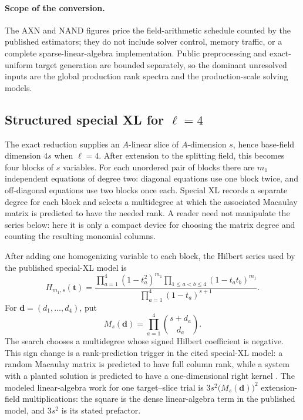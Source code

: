 \documentclass[11pt]{article}
\begin{document}
\paragraph{Scope of the conversion.}
The AXN and NAND figures price the field-arithmetic schedule counted by the
published estimators; they do not include solver control, memory traffic, or a
complete sparse-linear-algebra implementation.  Public preprocessing and
exact-uniform target generation are bounded separately, so the dominant
unresolved inputs are the global production rank spectra and the
production-scale solving models.

\subsection{Structured special XL for \texorpdfstring{$\ell=4$}{l=4}}\label{sec:special-xl}

The exact reduction supplies an $A$-linear slice of $A$-dimension $s$,
hence base-field dimension $4s$ when $\ell=4$.  After extension to the
splitting field, this becomes four blocks of $s$ variables.  For each unordered pair of blocks there are $m_1$ independent equations
of degree two: diagonal equations use one block twice, and off-diagonal
equations use two blocks once each.  Special XL records a separate degree for
each block and selects a multidegree
at which the associated Macaulay matrix is predicted to have the needed rank.
A reader need not manipulate the series below: here it is only a compact device
for choosing the matrix degree and counting the resulting monomial columns.

After adding one homogenizing variable to each block, the Hilbert series used
by the published special-XL model is
\begin{equation}\label{eq:hilbert-series}
 H_{m_1,s}(\mathbf t)=
 \frac{\prod_{a=1}^{4}(1-t_a^2)^{m_1}
       \prod_{1\le a<b\le4}(1-t_at_b)^{m_1}}
      {\prod_{a=1}^{4}(1-t_a)^{s+1}}.
\end{equation}
For $\mathbf d=(d_1,\ldots,d_4)$, put
\begin{equation}\label{eq:macaulay-size}
 M_s(\mathbf d)=\prod_{a=1}^{4}\binom{s+d_a}{d_a}.
\end{equation}
The search chooses a multidegree whose signed Hilbert coefficient is
negative.  This sign change is a rank-prediction trigger in the cited
special-XL model: a random Macaulay matrix is predicted to have full column
rank, while a system with a planted solution is predicted to have a
one-dimensional right kernel
\cite{Cabarcas2025SNOVA}.  The modeled linear-algebra work for one target--slice trial is
$3s^2\bigl(M_s(\mathbf d)\bigr)^2$ extension-field multiplications: the square is the
dense linear-algebra term in the published model, and $3s^2$ is its stated
prefactor.
\end{document}
